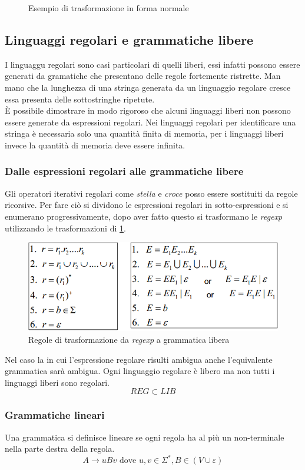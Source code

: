 \begin{figure}
	\centering
	\caption{Esempio di trasformazione in forma normale}
\end{figure}
\subsection{Linguaggi regolari e grammatiche libere}
I linguaggu regolari sono casi particolari di quelli liberi, essi infatti possono essere generati da gramatiche che presentano delle regole fortemente ristrette. Man mano che la lunghezza di una stringa generata da un linguaggio regolare cresce essa presenta delle sottostringhe ripetute.\\
È possibile dimostrare in modo rigoroso che alcuni linguaggi liberi non possono essere generate da espressioni regolari.
Nei linguaggi regolari per identificare una stringa è necessaria solo una quantità finita di memoria, per i linguaggi liberi invece la quantità di memoria deve essere infinita.
\subsubsection{Dalle espressioni regolari alle grammatiche libere}
Gli operatori iterativi regolari come \emph{stella} e \emph{croce} posso essere sostituiti da regole ricorsive. Per fare ciò si dividono le espressioni regolari in sotto-espressioni e si enumerano progressivamente, dopo aver fatto questo si trasformano le \emph{regexp} utilizzando le trasformazioni di \figurename \ref{fig:regtogram}.
\begin{figure}
	\centering
	\includegraphics[width=0.5\linewidth]{img/regtogram.png}
	\caption{Regole di trasformazione da \emph{regexp} a grammatica libera}\label{fig:regtogram}
\end{figure}
Nel caso la in cui l'espressione regolare risulti ambigua anche l'equivalente grammatica sarà ambigua. Ogni linguaggio regolare è libero ma non tutti i linguaggi liberi sono regolari.
$$REG \subset LIB$$
\subsubsection{Grammatiche lineari}
Una grammatica si definisce lineare se ogni regola ha al più un non-terminale nella parte destra della regola.
$$A\rightarrow uBv \text{ dove } u,v \in \Sigma^*, B\in (V\cup\varepsilon)$$
